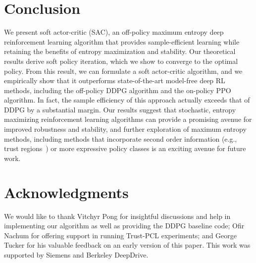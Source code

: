\documentclass{article}
\begin{document}




\newpage
\section{Conclusion}



We present soft actor-critic (SAC), an off-policy maximum entropy deep reinforcement learning algorithm that provides sample-efficient learning while retaining the benefits of entropy maximization and stability. Our theoretical results derive soft policy iteration, which we show to converge to the optimal policy. From this result, we can formulate a soft actor-critic algorithm, and we empirically show that it outperforms state-of-the-art model-free deep RL methods, including the off-policy DDPG algorithm and the on-policy PPO algorithm. In fact, the sample efficiency of this approach actually exceeds that of DDPG by a substantial margin. Our results suggest that stochastic, entropy maximizing reinforcement learning algorithms can provide a promising avenue for improved robustness and stability, and further exploration of maximum entropy methods, including methods that incorporate second order information (e.g., trust regions~\citep{schulman2015trust}) %
or more expressive policy classes is an exciting avenue for future work.


\section*{Acknowledgments}
We would like to thank Vitchyr Pong for insightful discussions and help in implementing our algorithm as well as providing the DDPG baseline code; Ofir Nachum for offering support in running Trust-PCL experiments; and George Tucker for his valuable feedback on an early version of this paper. This work was supported by Siemens and Berkeley DeepDrive.

\newpage


\FloatBarrier







\newpage
\onecolumn
\appendix
%
%
\end{document}
